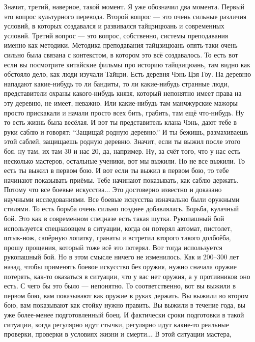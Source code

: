 Значит, третий, наверное, 
такой момент. Я уже обозначил два момента. Первый 
это вопрос культурного перевода.
Второй вопрос --- это 
очень сильные различия условий, в которых создавался и 
развивался тайцзицюань и современных условий.  Третий 
вопрос --- это вопрос, собственно, системы 
преподавания именно как методики. Методика 
преподавания тайцзицюань опять-таки очень сильно была 
связана с контекстом, в котором это всё создавалось. 
То есть вот если вы посмотрите китайские фильмы про 
историю тайцзицюань, там видно как обстояло 
дело, как люди изучали Тайцзи. Есть деревня Чэнь Цзя Гоу. 
На деревню нападают какие-нибудь то ли бандиты, то ли 
какие-нибудь странные люди, представители охраны
какого-нибудь князя, который непонятно имеет права на 
эту деревню, не имеет, неважно. Или какие-нибудь там 
манчжурские мажоры просто прискакали и начали просто 
всех бить, грабить, там ещё что-нибудь. Ну то есть 
жизнь была весёлая. И вот ты представитель клана Чэнь,  
дают тебе в руки саблю и говорят: ``Защищай родную деревню.''
И 
ты бежишь, размахиваешь этой саблей, защищаешь родную 
деревню.  Значит, если ты выжил после этого боя, ну 
там, их там 30 и нас 20, да, например.  Ну, за счёт того, что 
у нас есть несколько мастеров, остальные ученики, вот 
мы выжили. Но не все выжили. То есть ты выжил в первом 
бою. И вот если ты выжил в первом бою, то тебе начинают 
показывать приёмы. Тебе начинают показывать, как 
саблю держать. Потому что все боевые искусства... Это 
достоверно известно и доказано научными 
исследованиями. Все боевые искусства изначально были 
оружными стилями. То есть борьба очень сильно позднее 
добавлялась. Борьба, кулачный бой. Это как в 
современном спецназе есть такая шутка. Рукопашный бой 
используется спецназовцем в ситуации, когда он потерял 
автомат, пистолет, штык-нож, сапёрную лопатку, гранаты 
и встретил второго такого долбоёба, прошу прощения,  
который тоже всё это потерял. Вот тогда используется 
рукопашный бой. Но в этом смысле ничего не изменилось. 
Как и 200--300 лет назад, чтобы применять боевое искусство 
без оружия, нужно сначала оружие потерять, как-то 
оказаться в ситуации, что у вас нет оружия, а у 
противников оно есть. С чего бы это было --- непонятно.  
То соответственно, вот вы выжили в первом бою, вам 
показывают как оружие в руках держать. Вы выжили во 
втором бою, вам показывают как стойку нужно править.  
Вы выжили в течение года, вы уже более-менее 
подготовленный боец.  И фактически сроки подготовки в 
такой ситуации, когда регулярно идут стычки, 
регулярно идут какие-то реальные проверки, проверки в 
условиях жизни и смерти... В этой ситуации мастера, 

